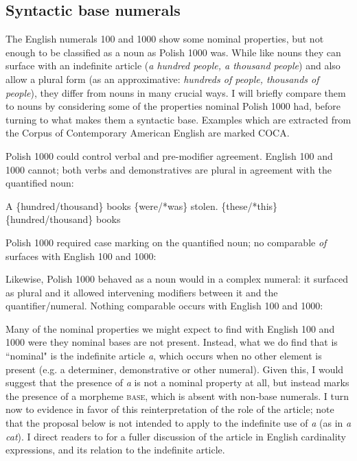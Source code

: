 \documentclass[output=paper]{langscibook}
\begin{document}
\subsection {Syntactic base numerals}

The English numerals 100 and 1000 show some nominal properties, but not enough to be classified as a noun as Polish 1000 was. While like nouns they can surface with an indefinite article (\textit{a hundred people, a thousand people}) and also allow a plural form (as an approximative: \textit{hundreds of people, thousands of people}), they differ from nouns in many crucial ways. I will briefly compare them to nouns by considering some of the properties nominal Polish 1000 had, before turning to what makes them a syntactic base. Examples which are extracted from the Corpus of Contemporary American English are marked COCA.

Polish 1000 could control verbal and pre-modifier agreement. English 100 and 1000 cannot; both verbs and demonstratives are plural in agreement with the quantified noun:

\ea 
\ea A \{hundred/thousand\} books \{were/*was\} stolen. 
\ex \{these/*this\} \{hundred/thousand\} books
\z \z

\noindent Polish 1000 required case marking on the quantified noun; no comparable \textit{of} surfaces with English 100 and 1000:

\z

\noindent Likewise, Polish 1000 behaved as a noun would in a complex numeral: it surfaced as plural and it allowed intervening modifiers between it and the quantifier/numeral. Nothing comparable occurs with English 100 and 1000:

\ea 
{}
\z \z

\noindent Many of the nominal properties we might expect to find with English 100 and 1000 were they nominal bases are not present. Instead, what we do find that is ``nominal" is the indefinite article \textit{a}, which occurs when no other element is present (e.g. a determiner, demonstrative or other numeral).
Given this, I would suggest that the presence of \textit{a} is not a nominal property at all, but instead marks the presence of a morpheme \textsc{base}, which is absent with non-base numerals. I turn now to evidence in favor of this reinterpretation of the role of the article; note that the proposal below is not intended to apply to the indefinite use of \textit{a} (as in \textit{a cat}). I  direct readers to \citet{klockmann2020} for a fuller discussion of the article in English cardinality expressions, and its relation to the indefinite article.
\end{document}
